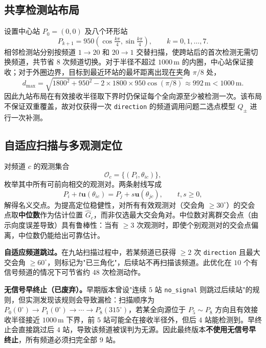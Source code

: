 \documentclass[12pt,a4paper]{ctexart}
\begin{document}
\subsection{共享检测站布局}
\label{sec:q3-stations}
设置中心站 $P_0=(0,0)$ 及八个环形站
\begin{equation}
 P_{k+1}=950\left(\cos\tfrac{k\pi}{4},\sin\tfrac{k\pi}{4}\right),
 \qquad k=0,1,\ldots,7.
 \label{eq:stations}
\end{equation}
相邻检测站分别按频道 $1\to20$ 和 $20\to1$ 交替扫描，使跨站后的首次检测无需切换频道，共节省 $8$ 次频道切换。对于半径不超过 $1000\,\mathrm{m}$ 的内圈，中心站保证接收；对于外圈边界，目标到最近环站的最坏距离出现在夹角 $\pi/8$ 处，
\begin{equation}
 d_{\max}=\sqrt{1800^2+950^2-2\times1800\times950\cos(\pi/8)}
 \approx992\,\mathrm{m}<1000\,\mathrm{m}.
\end{equation}
因此九站布局在有效接收半径取下界时仍保证每个全向源至少被检测一次。该布局不保证双重覆盖，故对仅获得一次 \texttt{direction} 的频道调用问题二选点模型 $Q_\pm$ 进行一次补测。

\subsection{自适应扫描与多观测定位}
\label{sec:q3-flow}
对频道 $c$ 的观测集合
\begin{equation}
 \mathcal O_c=\{(P_i,\theta_{ic})\},
\end{equation}
枚举其中所有可前向相交的观测对。两条射线写成
\[
 P_i+t\bm u(\theta_{ic})=P_j+s\bm u(\theta_{jc}),\qquad t,s\ge0,
\]
解得名义交点。为提高定位稳健性，对所有有效观测对（交会角 $\ge30^\circ$）的交会点取\textbf{中位数}作为估计位置 $\widehat G_c$，而非仅选最大交会角对。中位数对离群交会点（由示向度误差导致）具有鲁棒性：当有 $\ge3$ 次观测时，即使个别观测对的交会点偏离，中位数仍能给出可靠估计。

\textbf{自适应频道跳过。}在九站扫描过程中，若某频道已获得 $\ge2$ 次 \texttt{direction} 且最大交会角 $\ge60^\circ$，则标记为"已三角化"，后续站不再扫描该频道。此优化在 $10$ 个有信号频道的情况下可节省约 $48$ 次检测动作。

\textbf{无信号早终止（已废弃）。}早期版本曾设"连续 $5$ 站 \texttt{no\_signal} 则跳过后续站"的规则，但实测发现该规则会导致漏检：扫描顺序为 $P_0(0^\circ)\to P_1(0^\circ)\to\cdots\to P_8(315^\circ)$，若某全向源位于 $P_5\sim P_8$ 方向且有效接收半径接近 $1000\,\mathrm{m}$ 下界，前 $5$ 站可能全在接收半径外，但后 $4$ 站能检测到。早终止会直接跳过后 $4$ 站，导致该频道被误判为无源。因此最终版本\textbf{不使用无信号早终止}，所有频道必须扫完全部 $9$ 站。
\end{document}
